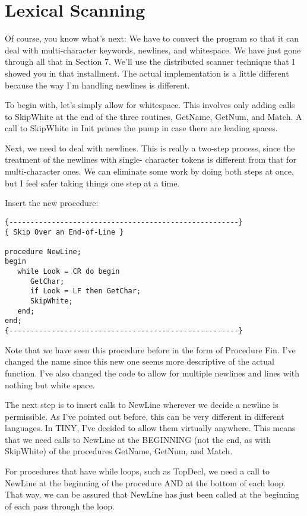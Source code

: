 \section{Lexical Scanning}

Of course, you know what's next:  We have to convert  the program so that  it can deal with multi-character keywords, newlines, and whitespace. We have just gone through all  that  in Section 7. We'll use the distributed scanner  technique that I showed you in that  installment. The  actual  implementation  is   a  little different because the way I'm handling newlines is different.

To begin with, let's simply  allow for whitespace. This involves only adding calls to SkipWhite at the end of the  three routines, GetName, GetNum, and Match. A call to SkipWhite in Init primes the pump in case there are leading spaces.

Next, we need to deal with  newlines. This is really a two-step process, since  the  treatment  of  the  newlines  with  single- character tokens is different from that for multi-character ones. We can eliminate some work by doing both  steps  at  once, but I feel safer taking things one step at a time.

Insert the new procedure:

\begin{verbatim}
{------------------------------------------------------}
{ Skip Over an End-of-Line }

procedure NewLine;
begin
   while Look = CR do begin
      GetChar;
      if Look = LF then GetChar;
      SkipWhite;
   end;
end;
{------------------------------------------------------}
\end{verbatim}

Note that  we  have  seen  this  procedure  before in the form of Procedure Fin. I've changed the name since this  new  one  seems more descriptive of the actual function. I've  also  changed the code  to  allow  for multiple newlines and lines with nothing but white space.

The next step is to insert calls to NewLine wherever we  decide a newline is permissible. As I've pointed out before, this  can be very different in different languages. In TINY, I've decided to allow them virtually anywhere. This means that we need  calls to NewLine at the BEGINNING (not the end, as with SkipWhite)  of the procedures GetName, GetNum, and Match.

For procedures that have while loops, such as TopDecl, we  need a call  to NewLine at the beginning of the  procedure  AND  at  the bottom  of  each  loop. That way, we can be assured that NewLine has just been called at the beginning of each  pass  through  the loop.

